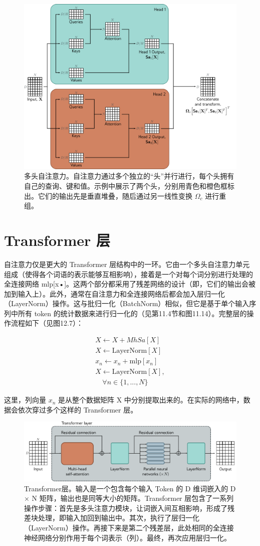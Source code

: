 \begin{figure}[ht!]
\centering
\includegraphics[width=0.7\linewidth]{png/chapter12/TransformerBlockSAMultiHead.png}
\caption{多头自注意力。自注意力通过多个独立的“头”并行进行，每个头拥有自己的查询、键和值。示例中展示了两个头，分别用青色和橙色框标出。它们的输出先是垂直堆叠，随后通过另一线性变换 \(\Omega_c\) 进行重组。}
\end{figure}


\section{Transformer 层}
自注意力仅是更大的 Transformer 层结构中的一环。它由一个多头自注意力单元组成（使得各个词语的表示能够互相影响），接着是一个对每个词分别进行处理的全连接网络 mlp[x•]。这两个部分都采用了残差网络的设计（即，它们的输出会被加到输入上）。此外，通常在自注意力和全连接网络后都会加入层归一化（LayerNorm）操作。这与批归一化（BatchNorm）相似，但它是基于单个输入序列中所有 token 的统计数据来进行归一化的（见第11.4节和图11.14）。完整层的操作流程如下（见图12.7）：

\begin{align}
X \leftarrow X + MhSa[X] \\
X \leftarrow \text{LayerNorm}[X] \\
x_n \leftarrow x_n + \text{mlp}[x_n] \\
X \leftarrow \text{LayerNorm}[X], \\
\quad \forall n \in \{1,...,N\} 
\end{align} 


这里，列向量 \(x_n\) 是从整个数据矩阵 X 中分别提取出来的。在实际的网络中，数据会依次穿过多个这样的 Transformer 层。

\begin{figure}[ht!]
\centering
\includegraphics[width=0.7\linewidth]{png/chapter12/TransformerBlock.png}
\caption{Transformer层。输入是一个包含每个输入 Token 的 D 维词嵌入的 D × N 矩阵，输出也是同等大小的矩阵。Transformer 层包含了一系列操作步骤：首先是多头注意力模块，让词嵌入间互相影响，形成了残差块处理，即输入加回到输出中。其次，执行了层归一化（LayerNorm）操作。再接下来是第二个残差层，此处相同的全连接神经网络分别作用于每个词表示（列）。最终，再次应用层归一化。}
\end{figure}


